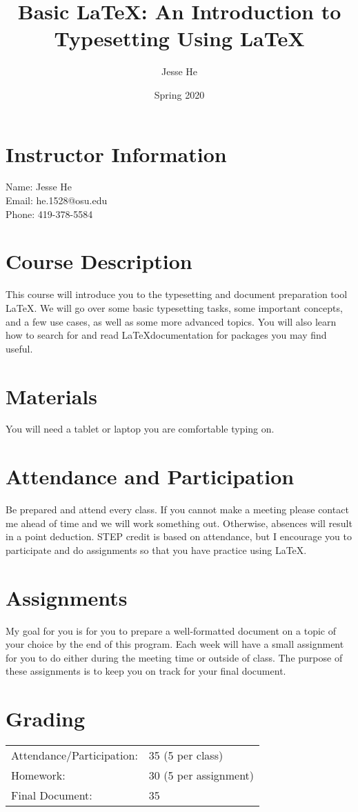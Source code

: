 \documentclass{article}
\title{Basic \LaTeX: An Introduction to Typesetting Using \LaTeX}
\author{Jesse He}
\date{Spring 2020}
\newcounter{week}
\begin{document}
\maketitle

\section{Instructor Information}
Name: Jesse He \\
Email: he.1528@osu.edu \\
Phone: 419-378-5584

\section{Course Description}
This course will introduce you to the typesetting and document preparation tool \LaTeX.
We will go over some basic typesetting tasks, some important concepts, and a few use cases, as well as some more advanced topics.
You will also learn how to search for and read \LaTeX documentation for packages you may find useful.

\section{Materials}
You will need a tablet or laptop you are comfortable typing on.

\section{Attendance and Participation}
Be prepared and attend every class.
If you cannot make a meeting please contact me ahead of time and we will work something out.
Otherwise, absences will result in a point deduction.
STEP credit is based on attendance, but I encourage you to participate and do assignments so that you have practice using \LaTeX.

\section{Assignments}
My goal for you is for you to prepare a well-formatted document on a topic of your choice by the end of this program.
Each week will have a small assignment for you to do either during the meeting time or outside of class.
The purpose of these assignments is to keep you on track for your final document.

\section{Grading}
\begin{tabular}{ll}
    Attendance/Participation: & 35 (5 per class)\\
    Homework: & 30 (5 per assignment)\\
    Final Document: & 35
\end{tabular}
\end{document}
